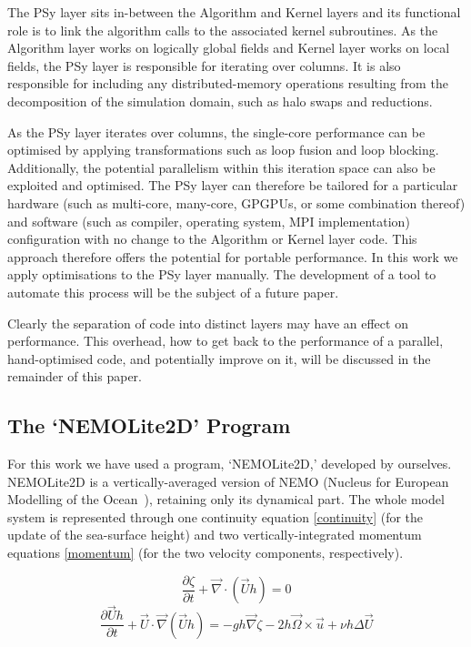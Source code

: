 \documentclass[journal]{IEEEtran}
\begin{document}
The PSy layer sits in-between the Algorithm and Kernel layers and its
functional role is to link the algorithm calls to the associated
kernel subroutines. As the Algorithm layer works on logically global
fields and Kernel layer works on local fields, the PSy layer is
responsible for iterating over columns. It is also responsible for
including any distributed-memory operations resulting from the
decomposition of the simulation domain, such as halo swaps and
reductions.

As the PSy layer iterates over columns, the single-core performance
can be optimised by applying transformations such as loop fusion and
loop blocking. Additionally, the potential parallelism within this
iteration space can also be exploited and optimised. The PSy layer can
therefore be tailored for a particular hardware (such as multi-core,
many-core, GPGPUs, or some combination thereof) and software (such as
compiler, operating system, MPI implementation) configuration with no
change to the Algorithm or Kernel layer code. This approach therefore
offers the potential for portable performance. In this work we apply
optimisations to the PSy layer manually. The development of a tool to
automate this process will be the subject of a future paper.

Clearly the separation of code into distinct layers may have an effect
on performance. This overhead, how to get back to the performance of a
parallel, hand-optimised code, and potentially improve on it, will be
discussed in the remainder of this paper.

\subsection{The `NEMOLite2D' Program}

For this work we have used a program, `NEMOLite2D,' developed by
ourselves.  NEMOLite2D is a vertically-averaged version of NEMO
(Nucleus for European Modelling of the Ocean~\cite{nemo}), retaining
only its dynamical part. The whole model system is represented through
one continuity equation \eqref{continuity} (for the update of the
sea-surface height) and two vertically-integrated momentum equations
\eqref{momentum} (for the two velocity components, respectively).

\begin{equation}\label{continuity}
 \frac{\partial \zeta}{\partial t} + \vec{\nabla} \cdot (\vec{U}h) = 0
\end{equation}
\begin{equation}\label{momentum}
 \frac{\partial \vec{U}h}{\partial t}
   + \vec{U} \cdot \vec{\nabla} (\vec{U}h) = 
   - gh \vec{\nabla} \zeta - 2h \vec{\Omega} \times \vec{u}
   + \nu h \Delta \vec{U}
\end{equation}
\end{document}
